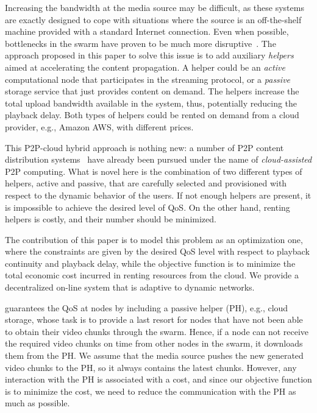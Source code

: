 Increasing the bandwidth at the media source may be difficult, as these systems
are exactly designed to cope with situations where the source is an off-the-shelf machine provided with a standard Internet connection. Even when
possible, bottlenecks in the swarm have proven to be much more
disruptive~\cite{Kumar:MDT}. The approach proposed in this paper to solve
this issue is to add auxiliary \emph{helpers} aimed at accelerating the content 
propagation.  A helper could
be an \emph{active} computational node that participates in the streaming
protocol, or a \emph{passive} storage service that just provides
content on demand. The helpers increase the total upload bandwidth available
in the system, thus, potentially reducing the playback delay. Both types of
helpers could be rented on demand from a cloud provider, e.g., Amazon AWS, with different prices. 

This P2P-cloud hybrid approach is nothing
new: a number of P2P content distribution systems~\cite{CloudAngel,cloudcast,Sripanidkulchai,sripanidkulchai2004analysis} have already been pursued under the name of \emph{cloud-assisted} P2P computing.
What is novel here is the combination of two different types of helpers, active and passive, that are carefully selected and provisioned
with respect to the dynamic behavior of the users. If not enough
helpers are present, it is impossible to achieve the desired level of
QoS. On the other hand, renting helpers is costly, and their number should be
minimized.

The contribution of this paper is to model this problem as an optimization one,
where the constraints are given by the desired QoS level with respect to playback continuity and playback delay, while the objective
function is to minimize the total economic cost incurred in renting resources from the cloud. We provide \clive a decentralized on-line system that is adaptive to dynamic networks.

\clive guarantees the QoS at nodes by including a passive helper (PH), e.g., cloud storage, whose task is to provide a last resort for nodes that have not been able to obtain their video chunks through the swarm. Hence, if a node can not receive the required video chunks on time from other nodes in the swarm, it downloads them from the PH. We assume that the media source pushes the new generated video chunks to the PH, so it always contains the latest chunks. However, any interaction with the PH is associated with a cost, and since our objective function is to minimize the cost, we need to reduce the communication with the PH as much as possible.

